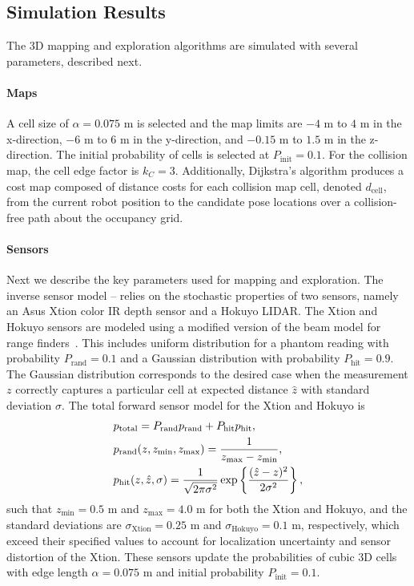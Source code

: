 \subsection{Simulation Results}


The 3D mapping and exploration algorithms are simulated with several parameters, described next.

\paragraph{Maps}

A cell size of $\alpha=0.075$ m is selected and the map limits are $-4$ m to $4$ m in the x-direction, $-6$ m to $6$ m in the y-direction, and $-0.15$ m to $1.5$ m in the z-direction. The initial probability of cells is selected at $P_\text{init}=0.1$. For the collision map, the cell edge factor is $k_C=3$. Additionally, Dijkstra's algorithm produces a cost map composed of distance costs for each collision map cell, denoted $d_\text{cell}$, from the current robot position to the candidate pose locations over a collision-free path about the occupancy grid. 

\paragraph{Sensors}

Next we describe the key parameters used for mapping and exploration. The inverse sensor model -- relies on the stochastic properties of two sensors, namely an Asus Xtion color IR depth sensor and a Hokuyo LIDAR. The Xtion and Hokuyo sensors are modeled using a modified version of the beam model for range finders~\cite{ThrBurFox05}. This includes uniform distribution for a phantom reading with probability $P_\text{rand}=0.1$ and a Gaussian distribution with probability $P_\text{hit}=0.9$. The Gaussian distribution corresponds to the desired case when the measurement $z$ correctly captures a particular cell at expected distance $\hat{z}$ with standard deviation $\sigma$. The total forward sensor model for the Xtion and Hokuyo is
\begin{align}
&p_\text{total}=P_\text{rand}p_\text{rand}+P_\text{hit}p_\text{hit},
\\
&p_\text{rand}(z,z_\text{min},z_\text{max})=\frac1{z_\text{max}-z_\text{min}},
\\
&p_\text{hit}(z,\hat{z},\sigma)=\frac1{\sqrt{2\pi\sigma^2}}\exp\left\{ \frac{(\hat{z}-z)^2}{{2\sigma^2}} \right\},
\end{align}
such that $z_\text{min}=0.5$ m and $z_\text{max}=4.0$ m for both the Xtion and Hokuyo, and the standard deviations are $\sigma_\text{Xtion}=0.25$ m and $\sigma_\text{Hokuyo}=0.1$ m, respectively, which exceed their specified values to account for localization uncertainty and sensor distortion of the Xtion. These sensors update the probabilities of cubic 3D cells with edge length $\alpha=0.075$ m and initial probability $P_\text{init}=0.1$.

